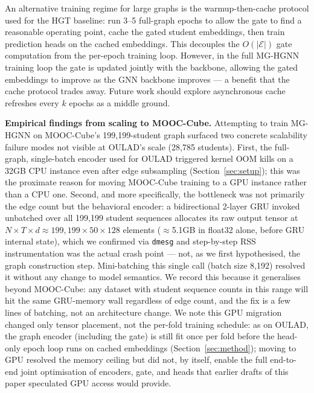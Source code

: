 \documentclass[sigconf,review]{acmart}
\begin{document}
An alternative training regime for large graphs is
the warmup-then-cache protocol used for the HGT
baseline: run 3--5 full-graph epochs to allow the
gate to find a reasonable operating point, cache
the gated student embeddings, then train prediction
heads on the cached embeddings. This decouples the
$O(|\mathcal{E}|)$ gate computation from the
per-epoch training loop. However, in the full
MG-HGNN training loop the gate is updated jointly
with the backbone, allowing the gated embeddings to
improve as the GNN backbone improves --- a benefit
that the cache protocol trades away. Future work
should explore asynchronous cache refreshes every
$k$ epochs as a middle ground.

\textbf{Empirical findings from scaling to MOOC-Cube.}
Attempting to train MG-HGNN on MOOC-Cube's 199,199-student
graph surfaced two concrete scalability failure modes not
visible at OULAD's scale (28,785 students). First, the
full-graph, single-batch encoder used for OULAD triggered
kernel OOM kills on a 32GB CPU instance even after edge
subsampling (Section~\ref{sec:setup}); this was the
proximate reason for moving MOOC-Cube training to a GPU
instance rather than a CPU one. Second, and more
specifically, the bottleneck was not primarily the edge
count but the behavioral encoder: a bidirectional 2-layer
GRU invoked unbatched over all 199,199 student sequences
allocates its raw output tensor at
$N \times T \times d \approx 199{,}199 \times 50 \times 128$
elements ($\approx$5.1GB in float32 alone, before GRU
internal state), which we confirmed via \texttt{dmesg}
and step-by-step RSS instrumentation was the actual crash
point --- not, as we first hypothesised, the graph
construction step. Mini-batching this single call
(batch size 8,192) resolved it without any change to
model semantics. We record this because it generalises
beyond MOOC-Cube: any dataset with student sequence
counts in this range will hit the same GRU-memory wall
regardless of edge count, and the fix is a few lines of
batching, not an architecture change. We note this
GPU migration changed only tensor placement, not the
per-fold training schedule: as on OULAD, the graph
encoder (including the gate) is still fit once per fold
before the head-only epoch loop runs on cached
embeddings (Section~\ref{sec:method}); moving to GPU
resolved the memory ceiling but did not, by itself,
enable the full end-to-end joint optimisation of
encoders, gate, and heads that earlier drafts of this
paper speculated GPU access would provide.

\end{document}
